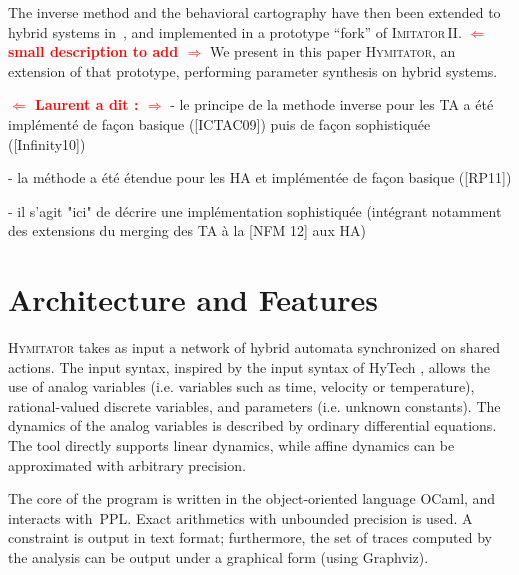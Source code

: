 \documentclass{llncs}
\newcommand{\graphviz}{Graphviz}
\newcommand{\hytech}{{\sc HyTech}}
\newcommand{\imitator}{\textsc{Imitator}}
\newcommand{\imitatordeux}{\textsc{Imitator}\,II}
\newcommand{\hymitator}{\textsc{Hymitator}}
\newcommand{\commentaire}[1]{\textcolor{red}{\textbf{$\Leftarrow$  #1 $\Rightarrow$}}}
\begin{document}
The inverse method and the behavioral cartography have then been extended to hybrid systems in~\cite{FK11}, and implemented in a prototype ``fork'' of \imitatordeux{}.
\commentaire{small description to add}
We present in this paper \hymitator{}, an extension of that prototype, performing parameter synthesis on hybrid systems.





\commentaire{Laurent a dit :}
- le principe de la methode inverse pour les TA a été implémenté de façon basique ([ICTAC09])
puis de façon sophistiquée ([Infinity10])

- la méthode a été étendue pour les HA et implémentée de façon basique ([RP11])

- il s'agit "ici" de décrire une implémentation sophistiquée (intégrant notamment des extensions
du merging des TA  à la  [NFM 12] aux HA)


\section{Architecture and Features}

\hymitator{} takes as input a network of hybrid automata synchronized on shared actions.
The input syntax, inspired by the input syntax of \hytech{}%
, allows the use of analog variables (i.e. variables such as time, velocity or temperature), rational-valued discrete variables, and parameters (i.e. unknown constants). The dynamics of the analog variables is described by ordinary differential equations. The tool directly supports linear dynamics, while affine dynamics can be approximated with arbitrary precision.

The core of the program is written in the object-oriented language OCaml, and interacts with~PPL.
Exact arithmetics with unbounded precision is used.
A constraint is output in text format; furthermore, the set of traces computed by the analysis can be output under a graphical form (using \graphviz{}).
\end{document}
